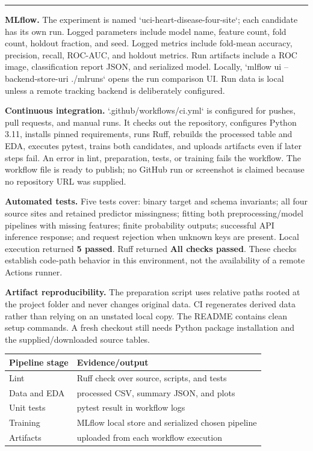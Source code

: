 \documentclass[10pt]{article}
\newcommand{\sectiontitle}[1]{\vspace*{0.15in}{\Large\bfseries\color{navy}#1}\par\vspace{0.08in}\hrule\vspace{0.16in}}
\begin{document}
\newpage
\sectiontitle{5. Experiment tracking, CI, and automated tests}
\textbf{MLflow.} The experiment is named `uci-heart-disease-four-site`; each candidate has its own run. Logged parameters include model name, feature count, fold count, holdout fraction, and seed. Logged metrics include fold-mean accuracy, precision, recall, ROC-AUC, and holdout metrics. Run artifacts include a ROC image, classification report JSON, and serialized model. Locally, `mlflow ui --backend-store-uri ./mlruns` opens the run comparison UI. Run data is local unless a remote tracking backend is deliberately configured.

\textbf{Continuous integration.} `.github/workflows/ci.yml` is configured for pushes, pull requests, and manual runs. It checks out the repository, configures Python 3.11, installs pinned requirements, runs Ruff, rebuilds the processed table and EDA, executes pytest, trains both candidates, and uploads artifacts even if later steps fail. An error in lint, preparation, tests, or training fails the workflow. The workflow file is ready to publish; no GitHub run or screenshot is claimed because no repository URL was supplied.

\textbf{Automated tests.} Five tests cover: binary target and schema invariants; all four source sites and retained predictor missingness; fitting both preprocessing/model pipelines with missing features; finite probability outputs; successful API inference response; and request rejection when unknown keys are present. Local execution returned \textbf{5 passed}. Ruff returned \textbf{All checks passed}. These checks establish code-path behavior in this environment, not the availability of a remote Actions runner.

\textbf{Artifact reproducibility.} The preparation script uses relative paths rooted at the project folder and never changes original data. CI regenerates derived data rather than relying on an unstated local copy. The README contains clean setup commands. A fresh checkout still needs Python package installation and the supplied/downloaded source tables.

\vspace{0.15in}
\begin{tabularx}{\linewidth}{@{}lX@{}}
\toprule
Pipeline stage & Evidence/output \\
\midrule
Lint & Ruff check over source, scripts, and tests \\
Data and EDA & processed CSV, summary JSON, and plots \\
Unit tests & pytest result in workflow logs \\
Training & MLflow local store and serialized chosen pipeline \\
Artifacts & uploaded from each workflow execution \\
\bottomrule
\end{tabularx}
\end{document}
